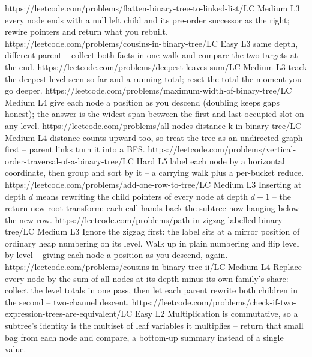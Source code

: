 \begin{mixedset}
    {https://leetcode.com/problems/flatten-binary-tree-to-linked-list/}{LC Medium L3}
    {every node ends with a null left child and its pre-order successor as the right;
    rewire pointers and return what you rebuilt.}
    {https://leetcode.com/problems/cousins-in-binary-tree/}{LC Easy L3}
    {same depth, different parent -- collect both facts in one walk and compare the
    two targets at the end.}
    {https://leetcode.com/problems/deepest-leaves-sum/}{LC Medium L3}
    {track the deepest level seen so far and a running total; reset the total the
    moment you go deeper.}
    {https://leetcode.com/problems/maximum-width-of-binary-tree/}{LC Medium L4}
    {give each node a position as you descend (doubling keeps gaps honest); the answer
    is the widest span between the first and last occupied slot on any level.}
    {https://leetcode.com/problems/all-nodes-distance-k-in-binary-tree/}{LC Medium L4}
    {distance counts upward too, so treat the tree as an undirected graph first --
    parent links turn it into a BFS.}
    {https://leetcode.com/problems/vertical-order-traversal-of-a-binary-tree/}{LC Hard L5}
    {label each node by a horizontal coordinate, then group and sort by it -- a
    carrying walk plus a per-bucket reduce.}
    {https://leetcode.com/problems/add-one-row-to-tree/}{LC Medium L3}
    {Inserting at depth $d$ means rewriting the child pointers of every node at depth
    $d-1$ -- the return-new-root transform: each call hands back the subtree now
    hanging below the new row.}
    {https://leetcode.com/problems/path-in-zigzag-labelled-binary-tree/}{LC Medium L3}
    {Ignore the zigzag first: the label sits at a mirror position of ordinary heap
    numbering on its level. Walk up in plain numbering and flip level by level --
    giving each node a position as you descend, again.}
    {https://leetcode.com/problems/cousins-in-binary-tree-ii/}{LC Medium L4}
    {Replace every node by the sum of all nodes at its depth minus its own family's
    share: collect the level totals in one pass, then let each parent rewrite both
    children in the second -- two-channel descent.}
    {https://leetcode.com/problems/check-if-two-expression-trees-are-equivalent/}{LC Easy L2}
    {Multiplication is commutative, so a subtree's identity is the multiset of leaf
    variables it multiplies -- return that small bag from each node and compare,
    a bottom-up summary instead of a single value.}
\end{mixedset}


